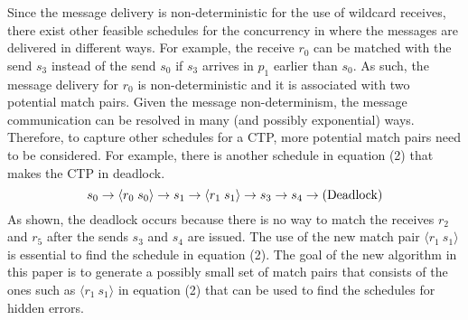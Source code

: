 Since the message delivery is non-deterministic for the use of wildcard receives, there exist other feasible schedules for the concurrency in  where the messages are delivered in different ways. For example,  the receive $r_0$ can be matched with the send $s_3$ instead of the send $s_0$ if $s_3$ arrives in $p_1$ earlier than $s_0$. As such, the message delivery for $r_0$ is non-deterministic and it is associated with two potential match pairs. 
Given the message non-determinism, the message communication can be resolved in many (and possibly exponential) ways. 
Therefore, to capture other schedules for a CTP, more potential match pairs need to be considered.
For example, there is another schedule in equation (2) that makes the CTP in  deadlock. 
\begin{equation}
\scriptsize
s_0\rightarrow \langle r_0\ s_0\rangle \rightarrow s_1\rightarrow \langle r_1\ s_1\rangle \rightarrow s_3\rightarrow s_4 \rightarrow (\mathrm{Deadlock})
\end{equation} 
As shown, the deadlock occurs because there is no way to match the receives $r_2$ and $r_5$ after the sends $s_3$ and $s_4$ are issued. The use of the new match pair $\langle r_1\ s_1\rangle$ is essential to find the schedule in equation (2).
The goal of the new algorithm in this paper is to generate a possibly small set of match pairs that consists of the ones such as $\langle r_1\ s_1\rangle$ in equation (2) that can be used to find the schedules for hidden errors.

